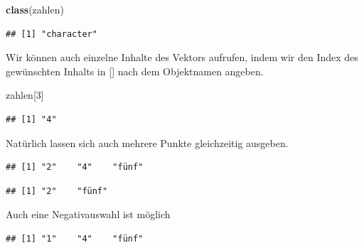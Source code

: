 \documentclass[
]{book}
\newenvironment{Shaded}{\begin{snugshade}}{\end{snugshade}}
\newcommand{\CommentTok}[1]{\textcolor[rgb]{0.56,0.35,0.01}{\textit{#1}}}
\newcommand{\DecValTok}[1]{\textcolor[rgb]{0.00,0.00,0.81}{#1}}
\newcommand{\KeywordTok}[1]{\textcolor[rgb]{0.13,0.29,0.53}{\textbf{#1}}}
\newcommand{\NormalTok}[1]{#1}
\newcommand{\OperatorTok}[1]{\textcolor[rgb]{0.81,0.36,0.00}{\textbf{#1}}}
\begin{document}
\begin{Shaded}
\begin{Highlighting}[]
\KeywordTok{class}\NormalTok{(zahlen)}
\end{Highlighting}
\end{Shaded}

\begin{verbatim}
## [1] "character"
\end{verbatim}

Wir können auch einzelne Inhalte des Vektors aufrufen, indem wir den Index des gewünschten Inhalts in {[}{]} nach dem Objektnamen angeben.

\begin{Shaded}
\begin{Highlighting}[]
\NormalTok{zahlen[}\DecValTok{3}\NormalTok{]}
\end{Highlighting}
\end{Shaded}

\begin{verbatim}
## [1] "4"
\end{verbatim}

Natürlich lassen sich auch mehrere Punkte gleichzeitig ausgeben.

\begin{Shaded}
\end{Shaded}

\begin{verbatim}
## [1] "2"    "4"    "fünf"
\end{verbatim}

\begin{Shaded}
\end{Shaded}

\begin{verbatim}
## [1] "2"    "fünf"
\end{verbatim}

Auch eine Negativauswahl ist möglich

\begin{verbatim}
## [1] "1"    "4"    "fünf"
\end{verbatim}
\end{document}
